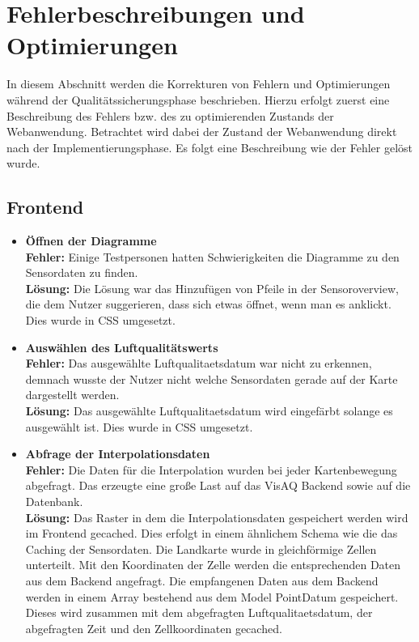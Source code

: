 \section{Fehlerbeschreibungen und Optimierungen}
In diesem Abschnitt werden die Korrekturen von Fehlern und Optimierungen während der Qualitätssicherungsphase beschrieben. Hierzu erfolgt zuerst eine Beschreibung des Fehlers bzw. des zu optimierenden Zustands der Webanwendung. Betrachtet wird dabei der Zustand der Webanwendung direkt nach der Implementierungsphase. Es folgt eine Beschreibung wie der Fehler gelöst wurde.

\subsection{Frontend}
\begin{itemize}
	\item \textbf{Öffnen der Diagramme}
	\\
	\textbf{Fehler:} Einige Testpersonen hatten Schwierigkeiten die Diagramme zu den Sensordaten zu finden.
	\\
	\textbf{Lösung:} Die Lösung war das Hinzufügen von Pfeile in der \gls{Sensoroverview}, die dem Nutzer suggerieren, dass sich etwas öffnet, wenn man es anklickt. Dies wurde in CSS umgesetzt.
	\item \textbf{Auswählen des Luftqualitätswerts}
	\\
	\textbf{Fehler:} Das ausgewählte \gls{Luftqualitaetsdatum} war nicht zu erkennen, demnach wusste der Nutzer nicht welche Sensordaten gerade auf der Karte dargestellt werden.
	\\
	\textbf{Lösung:} Das ausgewählte \gls{Luftqualitaetsdatum} wird eingefärbt solange es ausgewählt ist. Dies wurde in CSS umgesetzt.
	\item \textbf{Abfrage der Interpolationsdaten}
	\\
	\textbf{Fehler:} Die Daten für die Interpolation wurden bei jeder Kartenbewegung abgefragt. Das erzeugte eine große Last auf das VisAQ Backend sowie auf die Datenbank.
	\\
	\textbf{Lösung:} Das Raster in dem die Interpolationsdaten gespeichert werden wird im Frontend gecached. Dies erfolgt in einem ähnlichem Schema wie die das Caching der Sensordaten. Die Landkarte wurde in gleichförmige Zellen unterteilt. Mit den Koordinaten der Zelle werden die entsprechenden Daten aus dem Backend angefragt. Die empfangenen Daten aus dem Backend werden in einem Array bestehend aus dem Model PointDatum gespeichert. Dieses wird zusammen mit dem abgefragten \gls{Luftqualitaetsdatum}, der abgefragten Zeit und den Zellkoordinaten gecached.

\end{itemize}
